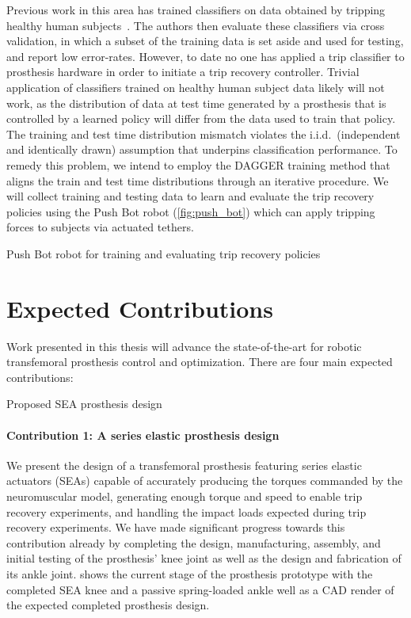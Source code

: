 Previous work in this area has trained classifiers on data obtained by tripping
healthy human subjects~\citep{lawson2010stumble, shirota2014recovery}. The
authors then evaluate these classifiers via cross validation, in which a subset
of the training data is set aside and used for testing, and report low
error-rates.  However, to date no one has applied a trip classifier to
prosthesis hardware in order to initiate a trip recovery controller. Trivial
application of classifiers trained on healthy human subject data likely will not
work, as the distribution of data at test time generated by a prosthesis that is
controlled by a learned policy will differ from the data used to train that
policy. The training and test time distribution mismatch violates the i.i.d.\
(independent and identically drawn) assumption that underpins classification
performance. To remedy this problem, we intend to employ the DAGGER training
method \citep{ross2011reduction} that aligns the train and test time
distributions through an iterative procedure. We will collect training and
testing data to learn and evaluate the trip recovery policies using the Push Bot
robot (\cref{fig:push_bot}) which can apply tripping forces to subjects via
actuated tethers.

\begin{marginfigure}
    \centering
    \caption{Push Bot robot for training and evaluating trip recovery policies}
    \label{fig:push_bot}
\end{marginfigure}

\section{Expected Contributions}

Work presented in this thesis will advance the state-of-the-art for robotic
transfemoral prosthesis control and optimization. There are four main expected 
contributions: 

\begin{marginfigure}
    \centering
    \caption{Proposed SEA prosthesis design}
    \label{fig:prosthesis_design}
\end{marginfigure}
\paragraph{Contribution 1: A series elastic prosthesis design} 
We present the design of a transfemoral prosthesis featuring series elastic
actuators (SEAs) capable of accurately producing the torques commanded by the
neuromuscular model, generating enough torque and speed to enable trip recovery
experiments, and handling the impact loads expected during trip recovery
experiments. We have made significant progress towards this contribution already
by completing the design, manufacturing, assembly, and initial testing of the
prosthesis' knee joint as well as the design and fabrication of its ankle joint.
\Cref{fig:prosthesis_design} shows the current stage of the prosthesis prototype
with the completed SEA knee and a passive spring-loaded ankle well as a CAD
render of the expected completed prosthesis design.

